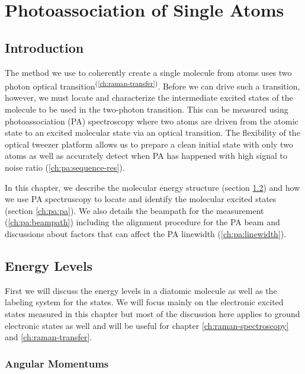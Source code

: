
\chapter{Photoassociation of Single Atoms}
\label{ch:pa}

\section{Introduction}

The method we use to coherently create a single molecule from atoms
uses two photon optical transition\textsuperscript{(\ref{ch:raman-transfer})}.
Before we can drive such a transition, however, we must locate and characterize
the intermediate excited states of the molecule to be used in the two-photon transition.
This can be measured using photoassociation (PA) spectroscopy
where two atoms are driven from the atomic state to an excited molecular state
via an optical transition.
The flexibility of the optical tweezer platform allows us to
prepare a clean initial state with only two atoms
as well as accurately detect when PA has happened
with high signal to noise ratio (\ref{ch:pa:sequence-res}).

In this chapter, we describe the molecular energy structure (section \ref{ch:pa:structure})
and how we use PA spectruscopy to locate and identify the molecular excited states
(section \ref{ch:pa:pa}).
We also details the beampath for the measurement (\ref{ch:pa:beampath}) including
the alignment procedure for the PA beam and discussions about factors that can affect
the PA linewidth (\ref{ch:pa:linewidth}).

\section{Energy Levels}
\label{ch:pa:structure}

First we will discuss the energy levels in a diatomic molecule
as well as the labeling system for the states.
We will focus mainly on the electronic excited states measured in this chapter
but most of the discussion here applies to ground electronic states as well
and will be useful for chapter \ref{ch:raman-spectroscopy} and \ref{ch:raman-transfer}.

\subsection{Angular Momentums}

